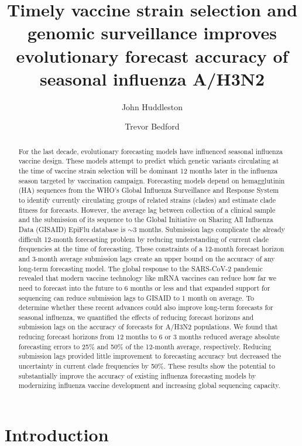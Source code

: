 \documentclass[9pt,lineno]{elife}
\title{Timely vaccine strain selection and genomic surveillance improves evolutionary forecast accuracy of seasonal influenza A/H3N2}
\author[1*]{John Huddleston}
\author[1,2]{Trevor Bedford}
\affil[1]{Vaccine and Infectious Disease Division, Fred Hutchinson Cancer Center, Seattle, WA, USA}
\affil[2]{Howard Hughes Medical Institute, Seattle, WA, USA}
\begin{document}
\maketitle

\begin{abstract}
For the last decade, evolutionary forecasting models have influenced seasonal influenza vaccine design.
These models attempt to predict which genetic variants circulating at the time of vaccine strain selection will be dominant 12 months later in the influenza season targeted by vaccination campaign.
Forecasting models depend on hemagglutinin (HA) sequences from the WHO’s Global Influenza Surveillance and Response System to identify currently circulating groups of related strains (clades) and estimate clade fitness for forecasts.
However, the average lag between collection of a clinical sample and the submission of its sequence to the Global Initiative on Sharing All Influenza Data (GISAID) EpiFlu database is $\sim$3 months.
Submission lags complicate the already difficult 12-month forecasting problem by reducing understanding of current clade frequencies at the time of forecasting.
These constraints of a 12-month forecast horizon and 3-month average submission lags create an upper bound on the accuracy of any long-term forecasting model.
The global response to the SARS-CoV-2 pandemic revealed that modern vaccine technology like mRNA vaccines can reduce how far we need to forecast into the future to 6 months or less and that expanded support for sequencing can reduce submission lags to GISAID to 1 month on average.
To determine whether these recent advances could also improve long-term forecasts for seasonal influenza, we quantified the effects of reducing forecast horizons and submission lags on the accuracy of forecasts for A/H3N2 populations.
We found that reducing forecast horizons from 12 months to 6 or 3 months reduced average absolute forecasting errors to 25\% and 50\% of the 12-month average, respectively.
Reducing submission lags provided little improvement to forecasting accuracy but decreased the uncertainty in current clade frequencies by 50\%.
These results show the potential to substantially improve the accuracy of existing influenza forecasting models by modernizing influenza vaccine development and increasing global sequencing capacity.
\end{abstract}

\section{Introduction}
\end{document}
